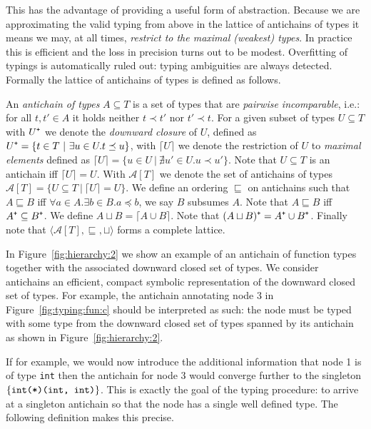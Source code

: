 \documentclass{sigplanconf}
\newcommand{\concept}[1]{\emph{#1}}
\newcommand{\mc}[1]{\mathcal{#1}}
\newcommand{\mt}[1]{\text{\tt #1}}
\begin{document}
This has the advantage of providing a useful form of
abstraction. Because we are approximating the valid typing from above
in the lattice of antichains of types it means we may, at all times,
\concept{restrict to the maximal (weakest) types}. In practice this is
efficient and the loss in precision turns out to be
modest. Overfitting of typings is automatically ruled out: typing
ambiguities are always detected.
Formally the lattice of antichains of types is defined as follows.
\begin{definition}[Antichains]\label{def:antichains}
An \concept{antichain of types} $A \subseteq T$ is a set of types that
are \concept{pairwise incomparable}, i.e.: for all $t, t' \in A$ it
holds neither $t \prec t'$ nor $t' \prec t$. For a given subset of
types $U \subseteq T$ with $U^\mt{+}$ we denote the \concept{downward
  closure} of $U$, defined as $U^\mt{+} = \{ t \in T\ |\ \exists u \in
U . t \preceq u \}$, with $\lceil U \rceil$ we denote the restriction
of $U$ to \concept{maximal elements} defined as $\lceil U \rceil = \{
u \in U\ |\ \nexists u' \in U . u \prec u' \}$. Note that $U \subseteq
T$ is an antichain iff $\lceil U \rceil = U$. With $\mc{A}[T]$ we
denote the set of antichains of types $\mc{A}[T] = \{ U \subseteq
T\ |\ \lceil U \rceil = U \}$. We define an ordering $\sqsubseteq$ on
antichains such that $A \sqsubseteq B$ iff $\forall a \in A. \exists b
\in B. a \preceq b$, we say $B$ subsumes $A$. Note that $A \sqsubseteq
B$ iff $A^\mt{+} \subseteq B^\mt{+}$. We define $A \sqcup B = \lceil A
\cup B \rceil$. Note that $(A \sqcup B)^\mt{+} = A^\mt{+} \cup
B^\mt{+}$. Finally note that $\langle \mc{A}[T], \sqsubseteq, \sqcup
\rangle$ forms a complete lattice.
\end{definition}
In Figure~\ref{fig:hierarchy:2} we show an example of an antichain of
function types together with the associated downward closed set of
types. We consider antichains an efficient, compact symbolic
representation of the downward closed set of types. For example, the
antichain annotating node 3 in Figure~\ref{fig:typing:fun:c} should be
interpreted as such: the node must be typed with some type from the
downward closed set of types spanned by its antichain as shown in
Figure~\ref{fig:hierarchy:2}. 

If for example, we would now introduce the additional information that
node 1 is of type \verb+int+ then the antichain for node 3 would
converge further to the singleton $\{ \verb+int(*)(int, int)+
\}$. This is exactly the goal of the typing procedure: to arrive at a
singleton antichain so that the node has a single well defined
type. The following definition makes this precise.
\end{document}
